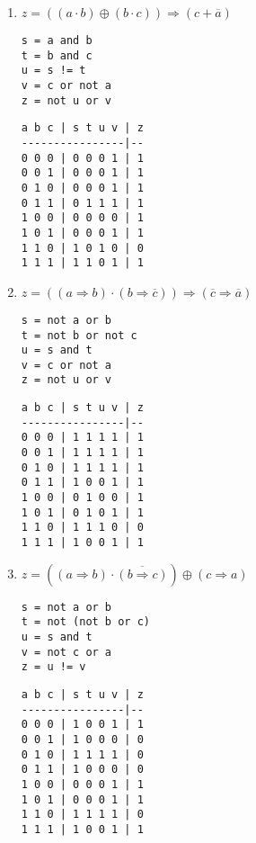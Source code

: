 \documentclass[11pt,a4paper]{article}
\begin{document}
\begin{enumerate}
\item $z = ((a \cdot b) \oplus (b \cdot c)) \Rightarrow ({c} + \overline{a})$
\hfill
\begin{minipage}[t]{4cm}\footnotesize
\begin{Verbatim}
s = a and b
t = b and c
u = s != t
v = c or not a
z = not u or v
\end{Verbatim}
\end{minipage}
\hspace*{3mm}
\begin{minipage}[t]{3.5cm}\footnotesize
\begin{Verbatim}
a b c | s t u v | z
----------------|--
0 0 0 | 0 0 0 1 | 1
0 0 1 | 0 0 0 1 | 1
0 1 0 | 0 0 0 1 | 1
0 1 1 | 0 1 1 1 | 1
1 0 0 | 0 0 0 0 | 1
1 0 1 | 0 0 0 1 | 1
1 1 0 | 1 0 1 0 | 0
1 1 1 | 1 1 0 1 | 1
\end{Verbatim}
\end{minipage}
\vspace*{3mm}

\item $z = ((a \Rightarrow b) \cdot (b \Rightarrow \overline{c})) \Rightarrow (\overline{c} \Rightarrow \overline{a})$
\hfill
\begin{minipage}[t]{4cm}\footnotesize
\begin{Verbatim}
s = not a or b
t = not b or not c
u = s and t
v = c or not a
z = not u or v
\end{Verbatim}
\end{minipage}
\hspace*{3mm}
\begin{minipage}[t]{3.5cm}\footnotesize
\begin{Verbatim}
a b c | s t u v | z
----------------|--
0 0 0 | 1 1 1 1 | 1
0 0 1 | 1 1 1 1 | 1
0 1 0 | 1 1 1 1 | 1
0 1 1 | 1 0 0 1 | 1
1 0 0 | 0 1 0 0 | 1
1 0 1 | 0 1 0 1 | 1
1 1 0 | 1 1 1 0 | 0
1 1 1 | 1 0 0 1 | 1
\end{Verbatim}
\end{minipage}
\vspace*{3mm}

\item $z = (({a} \Rightarrow {b}) \cdot \overline{(b \Rightarrow c)}) \oplus ({c} \Rightarrow {a})$
\hfill
\begin{minipage}[t]{4cm}\footnotesize
\begin{Verbatim}
s = not a or b
t = not (not b or c)
u = s and t
v = not c or a
z = u != v
\end{Verbatim}
\end{minipage}
\hspace*{3mm}
\begin{minipage}[t]{3.5cm}\footnotesize
\begin{Verbatim}
a b c | s t u v | z
----------------|--
0 0 0 | 1 0 0 1 | 1
0 0 1 | 1 0 0 0 | 0
0 1 0 | 1 1 1 1 | 0
0 1 1 | 1 0 0 0 | 0
1 0 0 | 0 0 0 1 | 1
1 0 1 | 0 0 0 1 | 1
1 1 0 | 1 1 1 1 | 0
1 1 1 | 1 0 0 1 | 1
\end{Verbatim}
\end{minipage}
\vspace*{3mm}


\end{enumerate}
\end{document}
